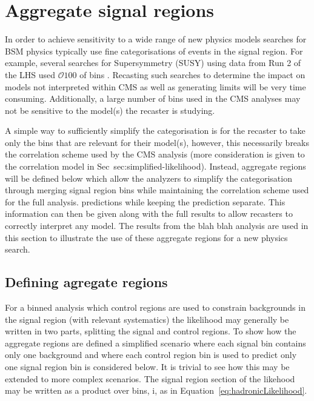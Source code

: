 \section{Aggregate signal regions}
\label{sec:aggregate-signal-regions}

In order to achieve sensitivity to a wide range of new physics models searches
for BSM physics typically use fine categorisations of events in the signal region.
For example, several searches for Supersymmetry (SUSY) using data from Run 2 of the LHS
used $\mathcal{O}100$ of bins \cite{susy-searches}. Recasting such searches to determine 
the impact on models not interpreted within CMS as well as generating limits will
be very time consuming. Additionally, a large number of bins used in the CMS analyses 
may not be sensitive to the model(s) the recaster is studying. 


A simple way to sufficiently simplify the categorisation is for the recaster to take only
the bins that are relevant for their model(s), however, this necessarily breaks 
the correlation scheme used by the CMS analysis (more consideration is 
given to the correlation model in Sec~{sec:simplified-likelihood}). Instead, aggregate regions
will be defined below which allow the analyzers to simplify the categorisation through
merging signal region bins while maintaining the correlation scheme used for the full analysis.
predictions while keeping the prediction separate. This information can then be given along
with the full results to allow recasters to correctly interpret any model. The results from 
the blah blah analysis are used in this section to illustrate the use of these aggregate regions
for a new physics search.

\subsection{Defining agregate regions}

For a binned analysis which control regions are used to constrain backgrounds in the signal region
(with relevant systematics) the likelihood may generally be written in two parts, splitting the signal
and control regions. To show how the aggregate regions are defined a simplified scenario 
where each signal bin contains only one background and where each control region bin is used to
predict only one signal region bin is considered below. It is trivial to see how this may
be extended to more complex scenarios. The signal region section of the likehood may be written
as a product over bins, i, as in Equation~\ref{eq:hadronicLikelihood}.

